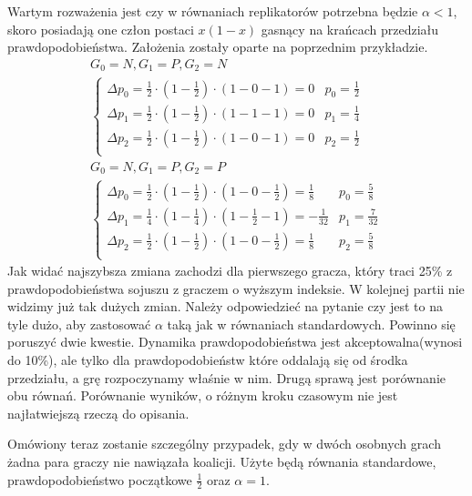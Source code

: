 Wartym rozważenia jest czy w równaniach replikatorów potrzebna będzie $\alpha < 1$, skoro posiadają one człon postaci $x(1-x)$ gasnący na krańcach przedziału prawdopodobieństwa. Założenia zostały oparte na poprzednim przykładzie.
\begin{gather*}
G_0 = N, G_1 = P, G_2 = N \\
\left\{
\begin{array}{ll}
\Delta p_0 = \frac{1}{2} \cdot (1 - \frac{1}{2}) \cdot (1 - 0 - 1) =  0 & p_0=\frac{1}{2}\\
\Delta p_1 = \frac{1}{2} \cdot (1 - \frac{1}{2}) \cdot (1 - 1 - 1) =  0 & p_1= \frac{1}{4}\\
\Delta p_2 = \frac{1}{2} \cdot (1 - \frac{1}{2}) \cdot (1 - 0 - 1) =  0 & p_2=\frac{1}{2}\\
\end{array} 
\right.
\\
G_0 = N, G_1 = P, G_2 = P \\
\left\{
\begin{array}{ll}
\Delta p_0 = \frac{1}{2} \cdot (1 - \frac{1}{2}) \cdot (1 - 0 - \frac{1}{2}) = \frac{1}{8} & p_0=\frac{5}{8}\\
\Delta p_1 = \frac{1}{4} \cdot (1 - \frac{1}{4}) \cdot (1 - \frac{1}{2} - 1) = -\frac{1}{32} & p_1= \frac{7}{32}\\
\Delta p_2 = \frac{1}{2} \cdot (1 - \frac{1}{2}) \cdot (1 - 0 - \frac{1}{2}) = \frac{1}{8}  & p_2=\frac{5}{8}\\
\end{array}
\right.
\end{gather*}
Jak widać najszybsza zmiana zachodzi dla pierwszego gracza, który traci 25\% z prawdopodobieństwa sojuszu z graczem o wyższym indeksie. W kolejnej partii nie widzimy już tak dużych zmian. Należy odpowiedzieć na pytanie czy jest to na tyle dużo, aby zastosować $\alpha$ taką jak w równaniach standardowych. Powinno się poruszyć dwie kwestie. Dynamika prawdopodobieństwa jest akceptowalna(wynosi do 10\%), ale tylko dla prawdopodobieństw które oddalają się od środka przedziału, a grę rozpoczynamy właśnie w nim. Drugą sprawą jest porównanie obu równań. Porównanie wyników, o różnym kroku czasowym nie jest najłatwiejszą rzeczą do opisania.


Omówiony teraz zostanie szczególny przypadek, gdy w dwóch osobnych grach żadna para graczy nie nawiązała koalicji. Użyte będą równania standardowe, prawdopodobieństwo początkowe $\frac{1}{2}$ oraz $\alpha = 1$.

